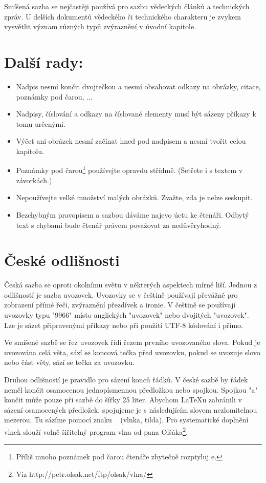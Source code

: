 \documentclass[czech,a4paper,10pt,twocolumn]{article}
\begin{document}
Smíšená sazba se nejčastěji používá pro sazbu vědeckých článků a technických zpráv. U delších dokumentů vědeckého či technického charakteru je zvykem vysvětlit význam různých typů zvýraznění v úvodní kapitole.

\section{Další rady:}
\begin{itemize}
\item Nadpis nesmí končit dvojtečkou a nesmí obsahovat odkazy na obrázky, citace, poznámky pod čarou, ...

\item Nadpisy, číslování a odkazy na číslované elementy musí být sázeny příkazy k tomu určenými.

\item Výčet ani obrázek nesmí začínat hned pod nadpisem a nesmí tvořit celou kapitolu.

\item Poznámky pod čarou\footnote[1]{Příliš mnoho poznámek pod čarou čtenáře zbytečně rozptyluj
e.} používejte opravdu střídmě. (Šetřete i s textem v závorkách.)

\item Nepoužívejte velké množství malých obrázků. Zvažte, zda je nelze seskupit.

\item Bezchybným pravopisem a sazbou dáváme najevo úctu ke čtenáři. Odbytý text s chybami bude čtenář právem považovat za nedůvěryhodný.
\end{itemize}

\section{České odlišnosti}

Česká sazba se oproti okolnímu světu v některých aspektech mírně liší. Jednou z odlišností je sazba uvozovek. Uvozovky se v češtině používají převážně pro zobrazení přímé řeči, zvýraznění přezdívek a ironie. V češtině se používají uvozovky typu "9966" místo anglických "uvozovek" nebo dvojitých "uvozovek". Lze je sázet připravenými příkazy nebo při použití UTF-8 kódování i přímo.

Ve smíšené sazbě se řez uvozovek řídí řezem prvního uvozovaného slova. Pokud je uvozována celá věta, sází se koncová tečka před uvozovku, pokud se uvozuje slovo nebo část věty, sází se tečka za uvozovku.

Druhou odlišností je pravidlo pro sázení konců řádků. V české sazbě by řádek neměl končit osamocenou jednopísmennou předložkou nebo spojkou. Spojkou "a" končit může pouze při sazbě do šířky 25 liter. Abychom LaTeXu zabránili v sázení osamocených předložek, spojujeme je s následujícím slovem nezlomitelnou mezerou. Tu sázíme pomocí znaku ~ (vlnka, tilda). Pro systematické doplnění vlnek slouží volně šiřitelný program vlna od pana Olšáka\footnote[2]{Viz http://petr.olsak.net/ftp/olsak/vlna/}.
\end{document}
